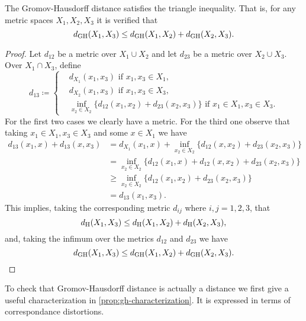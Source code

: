 \begin{lemma} \label{lemma:gh-triangle}
    The Gromov-Hausdorff distance satisfies the triangle inequality. That is, for any metric spaces $ X_1, X_2, X_3 $ it is verified that
    \begin{equation}
        d_{\operatorname{GH}}(X_1, X_3) \leq d_{\operatorname{GH}}(X_1, X_2) + d_{\operatorname{GH}}(X_2, X_3).
    \end{equation}
\end{lemma}
\begin{proof}
    Let $ d_{12} $ be a metric over $ X_1 \cup X_2 $ and let $ d_{23} $ be a metric over $ X_2 \cup X_3 $. Over $ X_1 \cap X_3 $, define
    \begin{equation}
        d_{13} \coloneq \begin{cases}
        &d_{X_1}(x_1, x_3) \text{ if } x_1, x_3 \in X_1, \\
        &d_{X_2}(x_1, x_3) \text{ if } x_1, x_3 \in X_3, \\
        &\inf_{x_2 \in X_2} \{d_{12}(x_1, x_2) + d_{23}(x_2, x_3)\} \text{ if } x_1 \in X_1, x_3 \in X_3.
        \end{cases}
    \end{equation}
    For the first two cases we clearly have a metric. For the third one observe that taking $ x_1 \in X_1, x_3 \in X_3 $ and some $ x \in X_1 $ we have
    \begin{align}
        d_{13}(x_1, x) + d_{13}(x, x_3) &= d_{X_1}(x_1, x) + \inf_{x_2 \in X_2} \{d_{12}(x, x_2) + d_{23}(x_2, x_3)\} \\
        &= \inf_{x_2 \in X_2} \{d_{12}(x_1, x) + d_{12}(x, x_2) + d_{23}(x_2, x_3)\} \\
        &\geq \inf_{x_2 \in X_2} \{d_{12}(x_1, x_2) + d_{23}(x_2, x_3)\} \\
        &= d_{13}(x_1, x_3).
    \end{align}
    This implies, taking the corresponding metric $ d_{ij} $ where $ i, j = 1, 2, 3$, that 
    \begin{equation}
        d_{\operatorname{H}}(X_1, X_3) \leq d_{\operatorname{H}}(X_1, X_2) + d_{\operatorname{H}}(X_2, X_3),
    \end{equation}
    and, taking the infimum over the metrics $ d_{12} $ and $ d_{23} $ we have
    \begin{equation}
        d_{\operatorname{GH}}(X_1, X_3) \leq d_{\operatorname{GH}}(X_1, X_2) + d_{\operatorname{GH}}(X_2, X_3).
    \end{equation}
\end{proof}

To check that Gromov-Hausdorff distance is actually a distance we first give a useful characterization in \ref{prop:gh-characterization}. It is expressed in terms of correspondance distortions.

